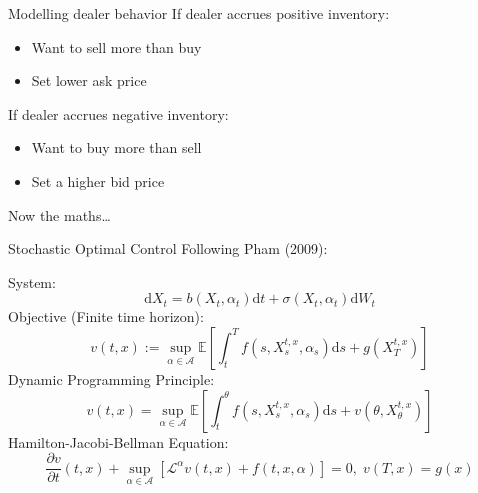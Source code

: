 \documentclass{beamer} %
\begin{document}
\begin{frame}{Modelling dealer behavior}
    If dealer accrues positive inventory:
    \begin{itemize}
        \item Want to sell more than buy
        \item Set lower ask price
    \end{itemize}
    If dealer accrues negative inventory:
    \begin{itemize}
        \item Want to buy more than sell
        \item Set a higher bid price
    \end{itemize}
    Now the maths\dots
\end{frame}

\begin{frame}{Stochastic Optimal Control}
    Following Pham (2009):

    System:
    \begin{equation}
        \mathrm dX_t=b(X_t,\alpha_t)\mathrm dt+\sigma(X_t,\alpha_t)\mathrm dW_t
    \end{equation}
    Objective (Finite time horizon):
    \begin{equation}
        v(t,x):=\sup_{\alpha\in\mathcal A}\mathbb{E}\left[\int_t^Tf(s,X_s^{t,x},\alpha_s)\mathrm ds+g(X_T^{t,x})\right]
    \end{equation}
    Dynamic Programming Principle:
    \begin{equation}
        v(t,x)=\sup_{\alpha\in\mathcal A}\mathbb{E}\left[\int_t^\theta f(s,X_s^{t,x},\alpha_s)\mathrm ds+v(\theta,X_\theta^{t,x})\right]
    \end{equation}
    Hamilton-Jacobi-Bellman Equation:
    \begin{equation}
        \frac{\partial v}{\partial t}(t,x)+\sup_{\alpha\in\mathcal{A}}\left[\mathcal{L}^\alpha v(t,x)+f(t,x,\alpha)\right]=0,\;v(T,x)=g(x)
    \end{equation}
\end{frame}
\end{document}
